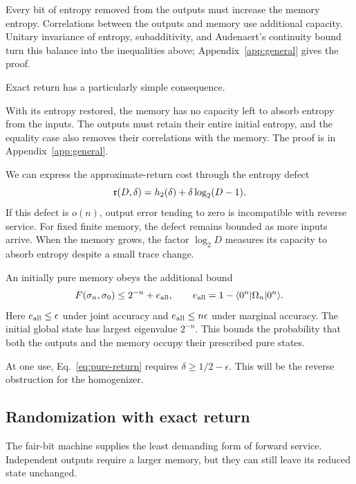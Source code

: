 \documentclass[aps,pra,reprint,superscriptaddress,longbibliography,nofootinbib,floatfix]{revtex4-2}
\begin{document}

Every bit of entropy removed from the outputs must increase the memory entropy. Correlations between the outputs and memory use additional capacity. Unitary invariance of entropy, subadditivity, and Audenaert's continuity bound~\cite{audenaert} turn this balance into the inequalities above; Appendix~\ref{app:general} gives the proof.

Exact return has a particularly simple consequence.


With its entropy restored, the memory has no capacity left to absorb entropy from the inputs. The outputs must retain their entire initial entropy, and the equality case also removes their correlations with the memory. The proof is in Appendix~\ref{app:general}.

We can express the approximate-return cost through the entropy defect
\begin{equation}
 \mathfrak r(D,\delta)=h_2(\delta)+\delta\log_2(D-1).
 \label{eq:defect}
\end{equation}
If this defect is $o(n)$, output error tending to zero is incompatible with reverse service. For fixed finite memory, the defect remains bounded as more inputs arrive. When the memory grows, the factor $\log_2D$ measures its capacity to absorb entropy despite a small trace change.

An initially pure memory obeys the additional bound
\begin{equation}
 F(\sigma_n,\sigma_0)\le2^{-n}+e_{\rm all},\qquad
 e_{\rm all}=1-\langle0^n|\Omega_n|0^n\rangle.
 \label{eq:pure-return}
\end{equation}
Here $e_{\rm all}\le\epsilon$ under joint accuracy and $e_{\rm all}\le n\epsilon$ under marginal accuracy. The initial global state has largest eigenvalue $2^{-n}$. This bounds the probability that both the outputs and the memory occupy their prescribed pure states.

At one use, Eq.~\eqref{eq:pure-return} requires $\delta\ge1/2-\epsilon$. This will be the reverse obstruction for the homogenizer.

\subsection{Randomization with exact return}

The fair-bit machine supplies the least demanding form of forward service. Independent outputs require a larger memory, but they can still leave its reduced state unchanged.
\end{document}
